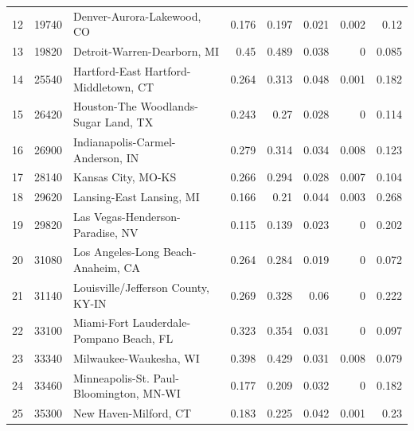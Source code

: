 \documentclass[
  10pt,
]{article}
\begin{document}
\begin{table}[h]
\begin{center}
{\begin{tabular}{rrlrrrrr}
 12 &  19740 & Denver-Aurora-Lakewood, CO                   &            0.176 &             0.197 &            0.021 &     0.002 &      0.12  \\
 13 &  19820 & Detroit-Warren-Dearborn, MI                  &            0.45  &             0.489 &            0.038 &     0     &      0.085 \\
 14 &  25540 & Hartford-East Hartford-Middletown, CT        &            0.264 &             0.313 &            0.048 &     0.001 &      0.182 \\
 15 &  26420 & Houston-The Woodlands-Sugar Land, TX         &            0.243 &             0.27  &            0.028 &     0     &      0.114 \\
 16 &  26900 & Indianapolis-Carmel-Anderson, IN             &            0.279 &             0.314 &            0.034 &     0.008 &      0.123 \\
 17 &  28140 & Kansas City, MO-KS                           &            0.266 &             0.294 &            0.028 &     0.007 &      0.104 \\
 18 &  29620 & Lansing-East Lansing, MI                     &            0.166 &             0.21  &            0.044 &     0.003 &      0.268 \\
 19 &  29820 & Las Vegas-Henderson-Paradise, NV             &            0.115 &             0.139 &            0.023 &     0     &      0.202 \\
 20 &  31080 & Los Angeles-Long Beach-Anaheim, CA           &            0.264 &             0.284 &            0.019 &     0     &      0.072 \\
 21 &  31140 & Louisville/Jefferson County, KY-IN           &            0.269 &             0.328 &            0.06  &     0     &      0.222 \\
 22 &  33100 & Miami-Fort Lauderdale-Pompano Beach, FL      &            0.323 &             0.354 &            0.031 &     0     &      0.097 \\
 23 &  33340 & Milwaukee-Waukesha, WI                       &            0.398 &             0.429 &            0.031 &     0.008 &      0.079 \\
 24 &  33460 & Minneapolis-St. Paul-Bloomington, MN-WI      &            0.177 &             0.209 &            0.032 &     0     &      0.182 \\
 25 &  35300 & New Haven-Milford, CT                        &            0.183 &             0.225 &            0.042 &     0.001 &      0.23  \\

\end{tabular}}
\end{center}
\end{table}
\end{document}
